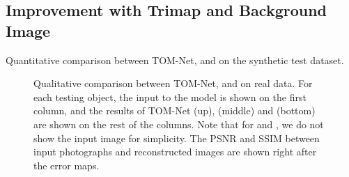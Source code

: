 \subsection{Improvement with Trimap and Background Image}
\begin{table}[htbp] \centering
    \caption[Quantitative comparison on the synthetic test dataset]{Quantitative comparison between TOM-Net, \TOMNetTrimap and \TOMNetBg on the synthetic test dataset.}
    
    \label{tab:stereo_quant_synth}
\end{table}

\begin{table}[htbp] \centering
    \caption[Quantitative comparison on real data]{Quantitative comparison between TOM-Net, \TOMNetTrimap and \TOMNetBg on real data.}
    \label{tab:real_quant_stereo}
\end{table}

\begin{figure} \centering
    
    \caption[Qualitative comparison on real data]{Qualitative comparison between TOM-Net, \TOMNetTrimap and \TOMNetBg on real data.
    For each testing object, the input to the model is shown on the first column, and the results of TOM-Net (up), \TOMNetTrimap (middle) and \TOMNetBg (bottom) are shown on the rest of the columns. Note that for \TOMNetTrimap and \TOMNetBg, we do not show the input image for simplicity. The PSNR and SSIM between input photographs and reconstructed images are shown right after the error maps.}
    \label{fig:qual_stereo_mono}
\end{figure}


